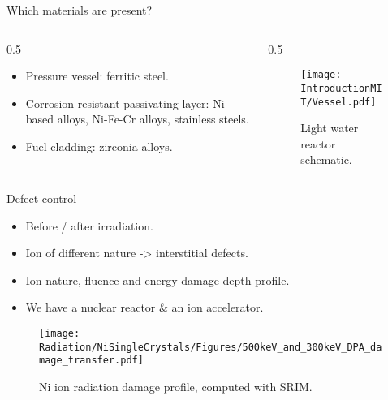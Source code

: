 \begin{column}{\colwidth}
\begin{block}{Which materials are present?}
\begin{columns}[T]
\begin{column}{0.5\colwidth}

                \begin{itemize}
                    \setlength\itemsep{1em}
                    \item Pressure vessel: ferritic steel.
                    \item Corrosion resistant passivating layer: Ni-based alloys, Ni-Fe-Cr alloys, stainless steels.
                    \item Fuel cladding: zirconia alloys.
                \end{itemize}

            \end{column}

            \begin{column}{0.5\colwidth}

                \begin{figure}
                   \centering
                   \texttt{[image: IntroductionMIT/Vessel.pdf]}
                   \caption{Light water reactor schematic.}
                   \label{fig:LWR}
                \end{figure}

            \end{column}
        \end{columns}

    \end{block}

    \begin{block}{Defect control}


        \begin{itemize}
            \setlength\itemsep{1em}
            \item Before / after irradiation.
            \item Ion of different nature -> interstitial defects.
            \item Ion nature, fluence and energy \rightarrow damage depth profile.
            \item We have a nuclear reactor \& an ion accelerator.
        \end{itemize}

        \begin{figure}
            \centering
            \texttt{[image: Radiation/NiSingleCrystals/Figures/500keV\_and\_300keV\_DPA\_damage\_transfer.pdf]}
            \caption{Ni ion radiation damage profile, computed with SRIM.}
            \label{fig:NiIonDamage}
        \end{figure}


\end{block}
\end{column}

